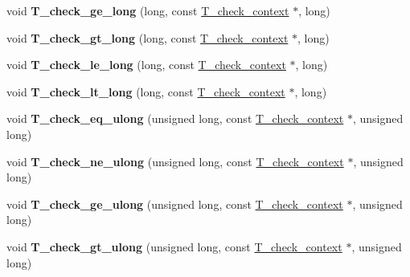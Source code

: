 \begin{DoxyCompactItemize}
void {\bfseries T\+\_\+check\+\_\+ge\+\_\+long} (long, const \mbox{\hyperlink{structT__check__context}{T\+\_\+check\+\_\+context}} $\ast$, long)
\item 
\mbox{\label{group__RTEMSTestFrameworkImpl_ga2fcdd38b84428445d0c1d33d8bebb972}} 
void {\bfseries T\+\_\+check\+\_\+gt\+\_\+long} (long, const \mbox{\hyperlink{structT__check__context}{T\+\_\+check\+\_\+context}} $\ast$, long)
\item 
\mbox{\label{group__RTEMSTestFrameworkImpl_ga871b71584c62680a30be0fd6ccfa5e5a}} 
void {\bfseries T\+\_\+check\+\_\+le\+\_\+long} (long, const \mbox{\hyperlink{structT__check__context}{T\+\_\+check\+\_\+context}} $\ast$, long)
\item 
\mbox{\label{group__RTEMSTestFrameworkImpl_ga1632db405e35040860f37172e2248ad1}} 
void {\bfseries T\+\_\+check\+\_\+lt\+\_\+long} (long, const \mbox{\hyperlink{structT__check__context}{T\+\_\+check\+\_\+context}} $\ast$, long)
\item 
\mbox{\label{group__RTEMSTestFrameworkImpl_ga1cda256b394a6b18e47110592fcbc817}} 
void {\bfseries T\+\_\+check\+\_\+eq\+\_\+ulong} (unsigned long, const \mbox{\hyperlink{structT__check__context}{T\+\_\+check\+\_\+context}} $\ast$, unsigned long)
\item 
\mbox{\label{group__RTEMSTestFrameworkImpl_ga642d7e789ecbc8059eb9337b517b53a1}} 
void {\bfseries T\+\_\+check\+\_\+ne\+\_\+ulong} (unsigned long, const \mbox{\hyperlink{structT__check__context}{T\+\_\+check\+\_\+context}} $\ast$, unsigned long)
\item 
\mbox{\label{group__RTEMSTestFrameworkImpl_ga177536c322db709a8e2c153fe48d587c}} 
void {\bfseries T\+\_\+check\+\_\+ge\+\_\+ulong} (unsigned long, const \mbox{\hyperlink{structT__check__context}{T\+\_\+check\+\_\+context}} $\ast$, unsigned long)
\item 
\mbox{\label{group__RTEMSTestFrameworkImpl_ga8260040e8de979a77b338bfe58a2ec8e}} 
void {\bfseries T\+\_\+check\+\_\+gt\+\_\+ulong} (unsigned long, const \mbox{\hyperlink{structT__check__context}{T\+\_\+check\+\_\+context}} $\ast$, unsigned long)

\end{DoxyCompactItemize}
